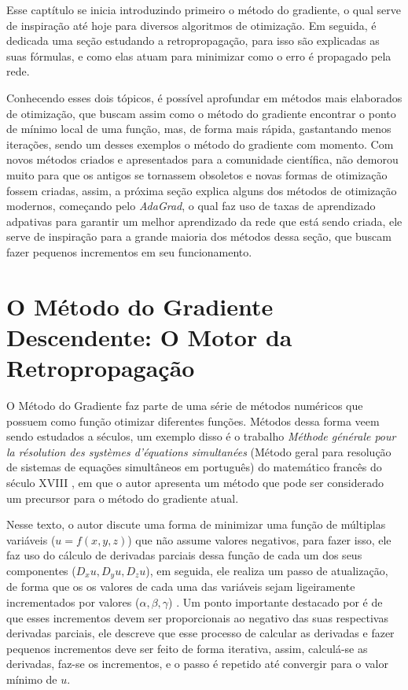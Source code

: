 Esse captítulo se inicia introduzindo primeiro o método do gradiente, o qual serve de inspiração até hoje para diversos algoritmos de otimização. Em seguida, é dedicada uma seção estudando a retropropagação, para isso são explicadas as suas fórmulas, e como elas atuam para minimizar como o erro é propagado pela rede. 

Conhecendo esses dois tópicos, é possível aprofundar em métodos mais elaborados de otimização, que buscam assim como o método do gradiente encontrar o ponto de mínimo local de uma função, mas, de forma mais rápida, gastantando menos iterações, sendo um desses exemplos o método do gradiente com momento. Com novos métodos criados e apresentados para a comunidade científica, não demorou muito para que os antigos se tornassem obsoletos e novas formas de otimização fossem criadas, assim, a próxima seção explica alguns dos métodos de otimização modernos, começando pelo \textit{AdaGrad}, o qual faz uso de taxas de aprendizado adpativas para garantir um melhor aprendizado da rede que está sendo criada, ele serve de inspiração para a grande maioria dos métodos dessa seção, que buscam fazer pequenos incrementos em seu funcionamento.


\section{O Método do Gradiente Descendente: O Motor da Retropropagação}

O Método do Gradiente faz parte de uma série de métodos numéricos que possuem como função otimizar diferentes funções. Métodos dessa forma veem sendo estudados a séculos, um exemplo disso é o trabalho \textit{M{\'e}thode g{\'e}n{\'e}rale pour la r{\'e}solution des syst{\`e}mes d'{\'e}quations simultan{\'e}es} (Método geral para resolução de sistemas de equações simultâneos em português) do matemático francês do século XVIII \textcite{CauchyMetodoDoGradiente}, em que o autor apresenta um método que pode ser considerado um precursor para o método do gradiente atual.

Nesse texto, o autor discute uma forma de minimizar uma função de múltiplas variáveis ($u=f(x,y,z)$) que não assume valores negativos, para fazer isso, ele faz uso do cálculo de derivadas parciais dessa função de cada um dos seus componentes ($D_x u, D_y u, D_z u$), em seguida, ele realiza um passo de atualização, de forma que os os valores de cada uma das variáveis sejam ligeiramente incrementados por valores ($\alpha, \beta, \gamma$) \parencite{CauchyMetodoDoGradiente}. Um ponto importante destacado por \textcite{CauchyMetodoDoGradiente} é de que esses incrementos devem ser proporcionais ao negativo das suas respectivas derivadas parciais, ele descreve que esse processo de calcular as derivadas e fazer pequenos incrementos deve ser feito de forma iterativa, assim, calculá-se as derivadas, faz-se os incrementos, e o passo é repetido até convergir para o valor mínimo de $u$.


